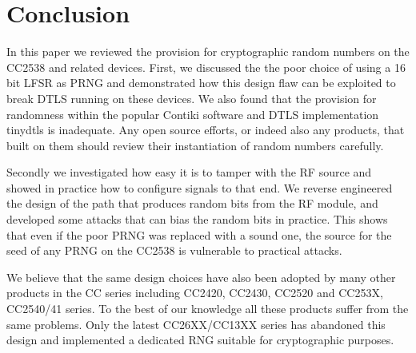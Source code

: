 \section{Conclusion}\label{Conclusion}
In this paper we reviewed the provision for cryptographic random numbers on the CC2538 and related devices. First, we discussed the the poor choice of using a 16 bit LFSR as PRNG  and demonstrated how this design flaw can be exploited to break DTLS running on these devices. We also found that the provision for randomness within the popular Contiki software and DTLS implementation tinydtls is inadequate. Any open source efforts, or indeed also any products, that built on them should review their instantiation of random numbers carefully. 

Secondly we investigated how easy it is to tamper with the RF source and showed in practice how to configure signals to that end. We reverse engineered the design of the path that produces random bits from the RF module, and developed some attacks that can bias the random bits in practice. This shows that even if the poor PRNG was replaced with a sound one, the source for the seed of any PRNG on the CC2538 is vulnerable to practical attacks.

We believe that the same design choices have also been adopted by many other products in the CC series including CC2420\cite{CC2420Manual}, CC2430\cite{CC2430Manual}, CC2520\cite{CC2520Manual} and CC253X, CC2540/41 series\cite{CC2530Manual}. To the best of our knowledge all these products suffer from the same problems. Only the latest CC26XX/CC13XX\cite{CC26XXManual} series has abandoned this design and implemented a dedicated RNG suitable for cryptographic purposes.




